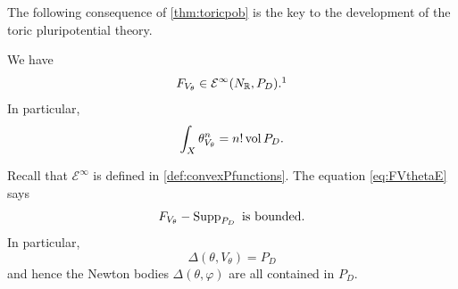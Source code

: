 The following consequence of \cref{thm:toricpob} is the key to the development of the toric pluripotential theory.
\begin{theorem}\label{thm:FVtheta}
    We have
    \begin{equation}\label{eq:FVthetaE}
    F_{V_{\theta}}\in \mathcal{E}^{\infty}(N_{\mathbb{R}},P_D).\footnotemark
    \end{equation}
    In particular,
    \begin{equation}\label{eq:toricminsingmass}
        \int_X  \theta_{V_{\theta}}^n=n!\operatorname{vol} P_D.
    \end{equation}
\end{theorem}
Recall that $\mathcal{E}^{\infty}$ is defined in \cref{def:convexPfunctions}. The equation \eqref{eq:FVthetaE} says
\begin{equation}\label{eq:FSupp_bdd_temp1}
F_{V_{\theta}}-\operatorname{Supp}_{P_D} \textup{ is bounded}.
\end{equation}
In particular,
\begin{equation}\label{eq:DeltaVthetaPD_temp1}
\Delta(\theta,V_{\theta})=P_D
\end{equation}
and hence the Newton bodies $\Delta(\theta,\varphi)$ are all contained in $P_D$.

